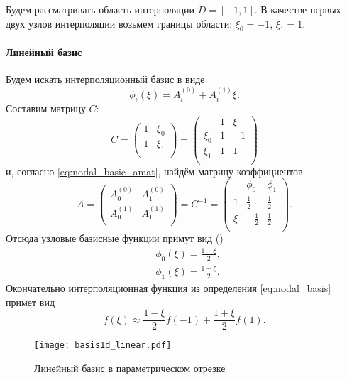 \label{sec:segment_bases}
Будем рассматривать область интерполяции $D=[-1, 1]$.
В качестве первых двух узлов интерполяции возьмем границы области:
$\xi_0 = -1$, $\xi_1 = 1$.
\paragraph{Линейный базис}
Будем искать интерполяционный базис в виде
$$
\phi_i(\xi) = A_i^{(0)} + A_i^{(1)} \xi.
$$
Составим матрицу $C$:
$$
C =
\left(
\begin{array}{cc}
1 & \xi_0 \\[5pt]
1 & \xi_1 \\[5pt]
\end{array}
\right) = 
\left(
\begin{array}{l|rr}
      & 1 & \xi\\
\hline
\xi_0 & 1 & -1 \\[5pt]
\xi_1 & 1 &  1 \\[5pt]
\end{array}
\right)
$$
и, согласно \cref{eq:nodal_basic_amat}, найдём матрицу коэффициентов
$$
A =
\left(
\begin{array}{cc}
A_0^{(0)} & A_1^{(0)} \\[5pt]
A_0^{(1)} & A_1^{(1)} \\[5pt]
\end{array}
\right) = C^{-1} =
\left(
\begin{array}{l|rr}
     & \phi_0   & \phi_1  \\
\hline
1    & \frac12  & \frac12 \\[5pt]
\xi  & -\frac12 & \frac12 \\[5pt]
\end{array}
\right).
$$
Отсюда узловые базисные функции примут вид ()
\begin{equation}
\label{eq:segment_linear_basis}
\begin{aligned}
&\phi_0(\xi) = \frac{1 - \xi}{2}, \\
&\phi_1(\xi) = \frac{1 + \xi}{2}.
\end{aligned}
\end{equation}
Окончательно интерполяционная функция из определения \cref{eq:nodal_basis}
примет вид
$$
f(\xi) \approx \frac{1 - \xi}{2} f(-1) + \frac{1 + \xi}{2} f(1).
$$
\begin{figure}[h!]
\centering
\texttt{[image: basis1d\_linear.pdf]}
\caption{Линейный базис в параметрическом отрезке}
\label{fig:basis1d_linear}
\end{figure}


